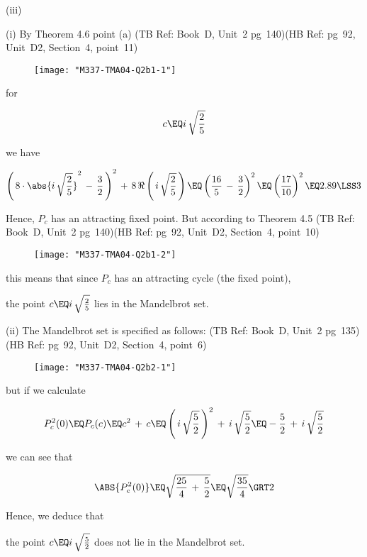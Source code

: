 \documentclass[english,a4paper,11pt]{scrartcl}
\begin{document}
\begin{labeling}{(iii) }
\item [(i)]  By Theorem 4.6 point (a) (TB Ref: Book~D, Unit~2 pg~140)(HB Ref: pg~92, Unit~D2, Section~4, point~11) \\

\begin{figure}[H]
	\centering
	\texttt{[image: "M337-TMA04-Q2b1-1"]}
\end{figure}

for

\[ c \EQ i \, \sqrt{\frac{2}{5}}  \]

we have

\[ \left(\, 8 \cdot \abs{i \, \sqrt{\frac{2}{5}}}^2 \,-\, \frac{3}{2} \,\right)^2 \,+\, 8\, \Re\left(\, i \, \sqrt{\frac{2}{5}} \,\right) \EQ \left( \frac{16}{5} \,-\, \frac{3}{2}\right)^2 \EQ \left( \frac{17}{10} \right)^2 \EQ 2.89 \LSS 3 \] 

\bigskip
Hence, $P_c$ has an attracting fixed point. But according to Theorem 4.5 (TB Ref: Book~D, Unit~2 pg~140)(HB Ref: pg~92, Unit~D2, Section~4, point~10) \\

\begin{figure}[H]
	\centering
	\texttt{[image: "M337-TMA04-Q2b1-2"]}
\end{figure}

this means that since $P_c$ has an attracting cycle (the fixed point), \\

\bigskip
\begin{Answer}
the point \quad \( c \EQ i \, \sqrt{\frac{2}{5}}  \) \quad lies in the Mandelbrot set.
\end{Answer}


\bigskip
\item [(ii)] The Mandelbrot set is specified as follows: (TB Ref: Book~D, Unit~2 pg~135)(HB Ref: pg~92, Unit~D2, Section~4, point~6) \\

\begin{figure}[H]
	\centering
	\texttt{[image: "M337-TMA04-Q2b2-1"]}
\end{figure}

but if we calculate

\[ P_c^2(0) \EQ  P_c(c) \EQ c^2 \,+\, c \EQ \left(\,  i \, \sqrt{\frac{5}{2}} \,\right)^2 \,+\,  i \, \sqrt{\frac{5}{2}} \EQ - \frac{5}{2} \,+\,  i \, \sqrt{\frac{5}{2}} \]

we can see that

\[ \ABS{P_c^2(0)} \EQ  \sqrt{ \frac{25}{4} \,+\, \frac{5}{2} } \EQ \sqrt{ \frac{35}{4}} \GRT 2 \]

\bigskip
Hence, we deduce that \\

\bigskip
\begin{Answer}
the point \quad \( c \EQ i \, \sqrt{\frac{5}{2}}  \) \quad does not lie in the Mandelbrot set.
\end{Answer}

  
\end{labeling}
\end{document}

